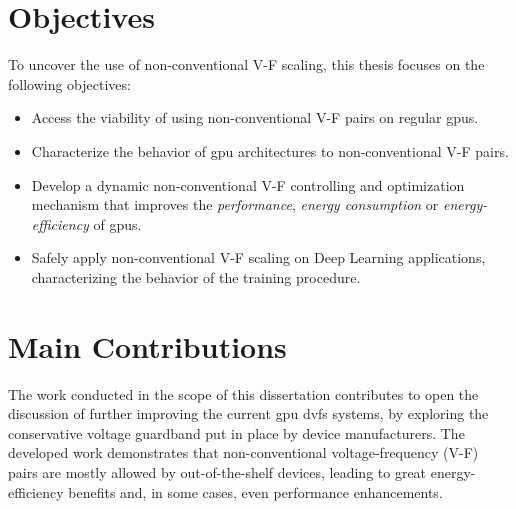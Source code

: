 

\section{Objectives}
\label{section:objectives}

To uncover the use of non-conventional V-F scaling, this thesis focuses on the following objectives:

\begin{itemize}
\item Access the viability of using non-conventional V-F pairs on regular \acrshort{gpu}s.
\item Characterize the behavior of \acrshort{gpu} architectures to non-conventional V-F pairs.
\item Develop a dynamic non-conventional V-F controlling and optimization mechanism that improves the \textit{performance}, \textit{energy consumption} or \textit{energy-efficiency} of \acrshort{gpu}s.
\item Safely apply non-conventional V-F scaling on Deep Learning applications, characterizing the behavior of the training procedure.
\end{itemize}


\section{Main Contributions}
\label{section:main_contri}

The work conducted in the scope of this dissertation contributes to open the discussion of further improving the current \acrshort{gpu} \acrshort{dvfs} systems, by exploring the conservative voltage guardband put in place by device manufacturers. The developed work demonstrates that non-conventional voltage-frequency (V-F) pairs are mostly allowed by out-of-the-shelf devices, leading to great energy-efficiency benefits and, in some cases, even performance enhancements. 

